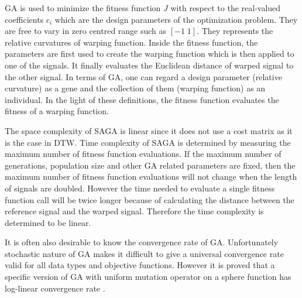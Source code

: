 \documentclass[number,1p,12pt]{elsarticle}
\begin{document}
GA is used to minimize the fitness function $J$ with respect to the real-valued coefficients $c_i$ which are the design parameters of the optimization problem. They are free to vary in zero centred range such as $[-1\;1]$. They represents the relative curvatures of warping function. Inside the fitness function, the parameters are first used to create the warping function which is then applied to one of the signals. It finally evaluates the Euclidean distance of warped signal to the other signal. In terms of GA, one can regard a design parameter (relative curvature) as a gene and the collection of them (warping function) as an individual. In the light of these definitions, the fitness function evaluates the fitness of a warping function. 

The space complexity of SAGA is linear since it does not use a cost matrix as it is the case in DTW. Time complexity of SAGA is determined by measuring the maximum number of fitness function evaluations. If the maximum number of generations, population size and other GA related parameters are fixed, then the maximum number of fitness function evaluations will not change when the length of signals are doubled. However the time needed to evaluate a single fitness function call will be twice longer because of calculating the distance between the reference signal and the warped signal. Therefore the time complexity is determined to be linear.

It is often also desirable to know the convergence rate of GA. Unfortunately stochastic nature of GA makes it difficult to give a universal convergence rate valid for all data types and objective functions. However it is proved that a specific version of GA with uniform mutation operator on a sphere function has log-linear convergence rate \cite{Auger2005}.
\end{document}
